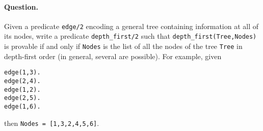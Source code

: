 \paragraph{Question.} Given a predicate \texttt{edge/2} encoding
a general tree containing information at all of its nodes, write a
predicate \texttt{depth\_first/2} such that
\texttt{depth\_first(Tree,Nodes)} is provable if and only if
\texttt{Nodes} is the list of all the nodes of the tree \texttt{Tree}
in depth-first order (in general, several are possible). For example,
given
\begin{verbatim}
edge(1,3).
edge(2,4).
edge(1,2).
edge(2,5).
edge(1,6).
\end{verbatim}
then \texttt{Nodes = [1,3,2,4,5,6]}.
